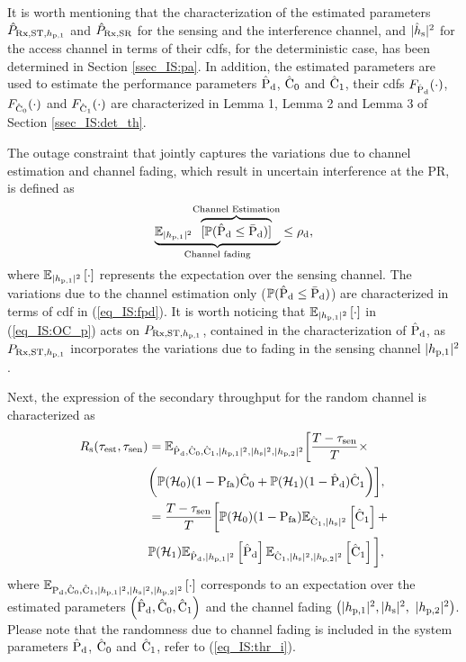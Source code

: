It is worth mentioning that the characterization of the estimated parameters $\eprcvdstpt$ and $\eprcvdsr$ for the sensing and the interference channel, and $\ephs$ for the access channel in terms of their cdfs, for the deterministic case, has been determined in Section \ref{ssec_IS:pa}. In addition, the estimated parameters are used to estimate the performance parameters $\epd$, $\ecz$ and $\eco$, their cdfs $\fpd(\cdot)$, $\fcz(\cdot)$ and $\fco(\cdot)$ are characterized in Lemma 1, Lemma 2 and Lemma 3 of Section \ref{ssec_IS:det_th}.

The outage constraint that jointly captures the variations due to channel estimation and channel fading, which result in uncertain interference at the PR, is defined as 
\begin{align}
\smash[b]{\underbrace{\mathbb{E}_{\phpo}{\smash[b]{\overbrace{[\p( \epd \le \pdd)]}^{\text{Channel Estimation}}}}}_{\text{Channel fading}}} &\le \mpd, \label{eq_IS:OC_p} \\[-0.1em] \nonumber 
\end{align}
where $\e{\phpo}{\cdot}$ represents the expectation over the sensing channel. The variations due to the channel estimation only ($\p(\epd \le \pdd)$) are characterized in terms of cdf in (\ref{eq_IS:fpd}).
It is worth noticing that $\e{\phpo}{\cdot}$ in (\ref{eq_IS:OC_p}) acts on $\prcvdstpt$, contained in the characterization of $\epd$, as $\prcvdstpt$ incorporates the variations due to fading in the sensing channel $\phpo$.

Next, the expression of the secondary throughput for the random channel is characterized as 
\begin{align}
\rs(\test, \tsen) &= \mathbb{E}_{\epd,\ecz,\eco,\phpo, \phs, \phpt} \bigg[ \frac{T - \tsen}{T} \times \nonumber \\ & \bigg( \phz (1 - \pfa) \ecz + \pho (1 -\epd) \eco \bigg) \bigg], \label{eq_IS:thr_p} \\
  \quad &= \frac{T - \tsen}{T} \bigg[ \phz (1 - \pfa) \e{\eco, \phs}{\eco} + \nonumber \\ & \pho \e{\epd, \phpo}{\epd} \e{\eco, \phs, \phpt}{\eco} \bigg], \nonumber 
\end{align}
where $\e{\pd,\ecz,\eco,\phpo, \phs, \phpt}{\cdot}$ corresponds to an expectation over the estimated parameters $\left( \epd, \ecz, \eco \right)$ and the channel fading $\big(\phpo, \phs,$ $\phpt \big)$. Please note that the randomness due to channel fading is included in the system parameters $\epd$, $\ecz$ and $\eco$, refer to (\ref{eq_IS:thr_i}).

